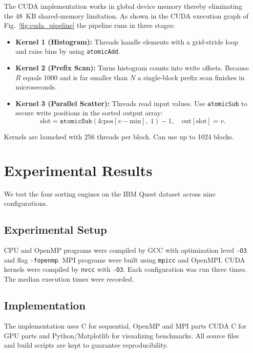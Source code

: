 \documentclass[conference]{IEEEtran}
\begin{document}
The CUDA implementation works in global device memory thereby eliminating the 48~KB shared-memory limitation. As shown in the CUDA execution graph of Fig.~\ref{fig:cuda_pipeline} the pipeline runs in three stages:
\begin{itemize}
\item \textbf{Kernel 1 (Histogram):} Threads handle elements with a grid-stride loop and raise bins by using \texttt{atomicAdd}.
\item \textbf{Kernel 2 (Prefix Scan):} Turns histogram counts into write offsets. Because $R$ equals 1000 and is far smaller than $N$ a single-block prefix scan finishes in microseconds.
\item \textbf{Kernel 3 (Parallel Scatter):} Threads read input values. Use \texttt{atomicSub} to secure write positions in the sorted output array:
\begin{equation}
\text{slot} = \texttt{atomicSub}\!\left(\&\text{pos}[v - \text{min}],\; 1\right) - 1, \quad \text{out}[\text{slot}] = v.
\label{eq:scatter}
\end{equation}
\end{itemize}
Kernels are launched with 256 threads per block. Can use up to 1024 blocks.

\section{Experimental Results}
We test the four sorting engines on the IBM Quest dataset across nine configurations.

\subsection{Experimental Setup}
CPU and OpenMP programs were compiled by GCC with optimization level \texttt{-O3} and flag \texttt{-fopenmp}. MPI programs were built using \texttt{mpicc} and OpenMPI. CUDA kernels were compiled by \texttt{nvcc} with \texttt{-O3}. Each configuration was run three times. The median execution times were recorded.

\subsection{Implementation}
The implementation uses C for sequential, OpenMP and MPI parts CUDA C for GPU parts and Python/Matplotlib for visualizing benchmarks. All source files and build scripts are kept to guarantee reproducibility.
\end{document}
